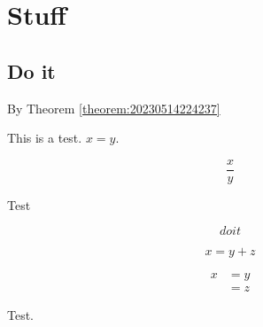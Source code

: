 \documentclass[reqno]{amsart}  
\numberwithin{equation}{section}
\numberwithin{theorem}{section}
\begin{document}
\section{Stuff}

\subsection{Do it}

By Theorem \ref{theorem:20230514224237}



This is a test.  $x=y$.

\begin{equation}
\frac{x}{y}
\end{equation}

\begin{theorem}\label{theorem:20230514224237}
Test
\end{theorem}

\begin{equation}
do it
\end{equation}


\begin{equation}\label{eqn:20230514223822}
x = y + z
\end{equation}

\begin{align}
  x &= y \label{testing} \\
  &= z \label{testing2}
\end{align}

\begin{theorem}\label{theorem:20230514234845}
  Test.
\end{theorem}
\end{document}
